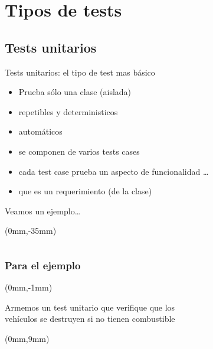 \section{Tipos de tests}

\subsection{Tests unitarios}

\begin{frame}{}
Tests unitarios: el tipo de test mas b\'asico
\begin{itemize}
	\item Prueba s\'olo una clase (aislada)
	\item repetibles y deterministicos
	\item autom\'aticos
	\item se componen de varios tests cases
	\item cada test case prueba un aspecto de funcionalidad \ldots
	\item que es un requerimiento (de la clase)
\end{itemize}
\end{frame}

\begin{frame}[fragile]{Veamos un ejemplo\ldots}
\begin{textblock*}{112mm}(0mm,-35mm)
	\begin{columns}[t,onlytextwidth]
		
		\begin{flushright}
		\end{flushright} 
	\end{columns}
\end{textblock*}
\end{frame}

\begin{frame}[t,fragile]
\frametitle{Para el ejemplo}
\begin{textblock*}{112mm}(0mm,-1mm)
\begin{center}
	Armemos un test unitario que verifique que los \\
	veh\'iculos se destruyen si no tienen combustible
\end{center}
\end{textblock*}
\begin{textblock*}{112mm}(0mm,9mm)
\begin{columns}[t,onlytextwidth]
	
	\begin{flushright}  \end{flushright} 
\end{columns}
\end{textblock*}
\end{frame}


